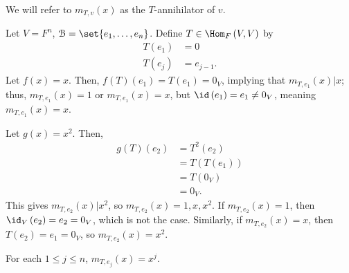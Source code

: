 \documentclass[10pt]{mypackage}
\begin{document}
We will refer to $m_{T,v}(x)$ as the $T$-annihilator of $v$.
\begin{example}
  Let $V = F^n$, $\mathcal{B} = \set{e_1,\dots,e_n}$. Define $T\in \Hom_{F}\left(V,V\right)$ by
  \begin{align*}
    T\left(e_1\right) &= 0\\
    T\left(e_{j}\right) &= e_{j-1} \tag*{$2\leq j\leq n$}.
  \end{align*}
  Let $f(x) = x$. Then, $f(T)\left(e_1\right) = T\left(e_1\right) = 0_V$, implying that $m_{T,e_1}\left(x\right) | x$; thus, $m_{T,e_1}(x) = 1$ or $m_{T,e_1}(x) = x$, but $\id\left(e_1\right) = e_1 \neq 0_V$, meaning $m_{T,e_1}\left(x\right) = x$.\newline

  Let $g(x) = x^2$. Then,
  \begin{align*}
    g(T)\left(e_2\right) &= T^{2}\left(e_2\right)\\
                         &= T\left(T\left(e_1\right)\right)\\
                         &= T\left(0_V\right)\\
                         &= 0_V.
  \end{align*}
  This gives $m_{T,e_2}(x) | x^2$, so $m_{T,e_2}(x) = 1,x,x^2$. If $m_{T,e_2}(x) = 1$, then $\id_V\left(e_2\right) = e_2 = 0_V$, which is not the case. Similarly, if $m_{T,e_2}(x) = x$, then $T(e_2) = e_1 = 0_V$, so $m_{T,e_2}(x) = x^2$.\newline

  For each $1 \leq j\leq n$, $m_{T,e_j}(x) = x^j$.
\end{example}
\end{document}
